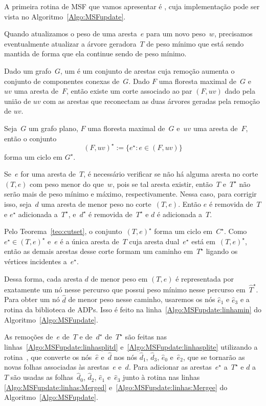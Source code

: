 A primeira rotina de MSF que vamos apresentar é \MSFupdate{}, cuja implementação pode ser vista no Algoritmo~\ref{Algo:MSFupdate}.

Quando atualizamos o peso de uma aresta~$e$ para um novo peso~$w$, precisamos eventualmente atualizar a árvore geradora~$T$ de peso mínimo que está sendo mantida de forma que ela continue sendo de peso mínimo.


Dado um grafo~$G$, um  é um conjunto de arestas cuja remoção aumenta o conjunto de componentes conexas de~$G$.
Dado $F$ uma floresta maximal de~$G$ e~$uv$ uma aresta de~$F$, então existe um corte associado ao par $(F, uv)$ dado pela união de $uv$ com as arestas que reconectam as duas árvores geradas pela remoção de $uv$.


\begin{theorem}
\label{teo:cutset}
Seja~$G$ um grafo plano, $F$ uma floresta maximal de~$G$ e~$uv$ uma aresta de~$F$, então o conjunto
$$
(F, uv)^\star := \{e^\star:e\in (F, uv)\}
$$
forma um ciclo em $G^\star$.
\end{theorem}


Se~$e$ for uma aresta de~$T$, é necessário verificar se não há alguma aresta no corte~$(T, e)$ com peso menor do que~$w$, pois se tal aresta existir, então~$T$ e~$T^\star$ não serão mais de peso mínimo e máximo, respectivamente.
Nessa caso, para corrigir isso, seja~$d$ uma aresta de menor peso no corte~$(T, e)$.
Então $e$ é removida de~$T$ e $e^\star$ adicionada a~$T^\star$, e~$d^\star$ é removida de~$T^\star$ e $d$ é adicionada a~$T$.

Pelo Teorema~\ref{teo:cutset}, o conjunto~$(T, e)^\star$ forma um ciclo em~$C^\star$.
Como~$e^\star \in (T, e)^\star$ e~$e$ é a única aresta de~$T$ cuja aresta dual~$e^\star$ está em~$(T, e)^\star$, então as demais arestas desse corte formam um caminho em~$T^\star$ ligando os vértices incidentes a~$e^\star$.

Dessa forma, cada aresta $d$ de menor peso em $(T, e)$ é representada por exatamente um nó nesse percurso que possui peso mínimo nesse percurso em~$\hat T^\star$.
Para obter um nó $\hat d$ de menor peso nesse caminho, usaremos os nós $\hat e_1$ e $\hat e_3$ e a rotina \LCOMin{} da biblioteca de ADPs.
Isso é feito na linha~\ref{Algo:MSFupdate:linhamin} do Algoritmo~\ref{Algo:MSFupdate}.

As remoções de~$e$ de~$T$ e de~$d^\star$ de~$T^\star$ são feitas nas linhas~\ref{Algo:MSFupdate:linhasplitd} e~\ref{Algo:MSFupdate:linhasplite} utilizando a rotina~\LCOSplit{}, que converte os nós~$\hat e$ e~$\hat d$ nos nós $\hat d_1$, $\hat d_3$, $\hat e_0$ e~$\hat e_2$, que se tornarão as novas folhas associadas às arestas~$e$ e~$d$.
Para adicionar as arestas~$e^\star$ a~$T^\star$ e $d$ a~$T$ são usadas as folhas~$\hat d_0$, $\hat d_2$, $\hat e_1$ e~$\hat e_3$ junto à rotina \LCOMerge{} nas linhas \ref{Algo:MSFupdate:linhas:Merged} e~\ref{Algo:MSFupdate:linhas:Mergee} do Algoritmo~\ref{Algo:MSFupdate}.


